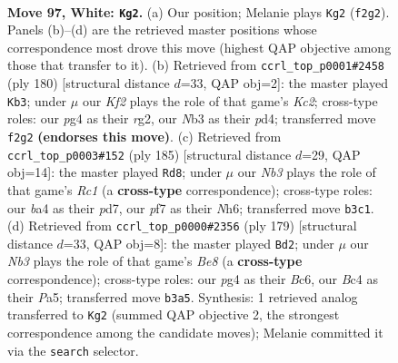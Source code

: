 \documentclass[11pt]{article}
\begin{document}
\clearpage

\begin{figure}[p]\centering
\begin{subfigure}{0.46\textwidth}\centering
\resizebox{\linewidth}{!}{%
\newchessgame
\chessboard[
  setfen={3r1k2/5p2/6p1/4P3/bnB2Ppp/1N6/5K1P/8 w - - 8 97},
  showmover=false,
  pgfstyle=straightmove, color=movearrow, markmove={f2-g2}
]}
\caption{}
\end{subfigure}\hfill
\begin{subfigure}{0.46\textwidth}\centering
\resizebox{\linewidth}{!}{%
\newchessgame
\chessboard[
  setfen={3B4/7p/p3B1pP/2k2p2/2Pp1P2/8/2K3r1/8 w - - 10 91},
  showmover=false,
  pgfstyle=straightmove, color=movearrow, markmove={c2-b3}
]}
\caption{}
\end{subfigure}
\\[4pt]
\begin{subfigure}{0.46\textwidth}\centering
\resizebox{\linewidth}{!}{%
\newchessgame
\chessboard[
  setfen={2r5/3P2k1/1p5n/p3p3/P3P2R/6P1/4B3/7K b - - 0 93},
  showmover=false,
  pgfstyle=straightmove, color=movearrow, markmove={c8-d8}
]}
\caption{}
\end{subfigure}\hfill
\begin{subfigure}{0.46\textwidth}\centering
\resizebox{\linewidth}{!}{%
\newchessgame
\chessboard[
  setfen={8/1p3p2/2b1p3/p1B1P2k/P4P2/7K/8/R3b3 b - - 3 90},
  showmover=false,
  pgfstyle=straightmove, color=movearrow, markmove={e1-d2}
]}
\caption{}
\end{subfigure}
\caption{\textbf{Move 97, White: \texttt{Kg2}.} (a) Our position; Melanie plays \texttt{Kg2} (\texttt{f2g2}). Panels (b)--(d) are the retrieved master positions whose correspondence most drove this move (highest QAP objective among those that transfer to it). (b) Retrieved from \texttt{ccrl\_top\_p0001\#2458} (ply 180) [structural distance $d$=33, QAP obj=2]: the master played \texttt{Kb3}; under $\mu$ our \emph{Kf2} plays the role of that game's \emph{Kc2}; cross-type roles: our \emph{p}g4 as their \emph{r}g2, our \emph{N}b3 as their \emph{p}d4; transferred move \texttt{f2g2} \textbf{(endorses this move)}. (c) Retrieved from \texttt{ccrl\_top\_p0003\#152} (ply 185) [structural distance $d$=29, QAP obj=14]: the master played \texttt{Rd8}; under $\mu$ our \emph{Nb3} plays the role of that game's \emph{Rc1} (a \textbf{cross-type} correspondence); cross-type roles: our \emph{b}a4 as their \emph{p}d7, our \emph{p}f7 as their \emph{N}h6; transferred move \texttt{b3c1}. (d) Retrieved from \texttt{ccrl\_top\_p0000\#2356} (ply 179) [structural distance $d$=33, QAP obj=8]: the master played \texttt{Bd2}; under $\mu$ our \emph{Nb3} plays the role of that game's \emph{Be8} (a \textbf{cross-type} correspondence); cross-type roles: our \emph{p}g4 as their \emph{B}c6, our \emph{B}c4 as their \emph{P}a5; transferred move \texttt{b3a5}. Synthesis: 1 retrieved analog transferred to \texttt{Kg2} (summed QAP objective 2, the strongest correspondence among the candidate moves); Melanie committed it via the \texttt{search} selector.}
\label{fig:thought-m192}
\end{figure}
\end{document}
